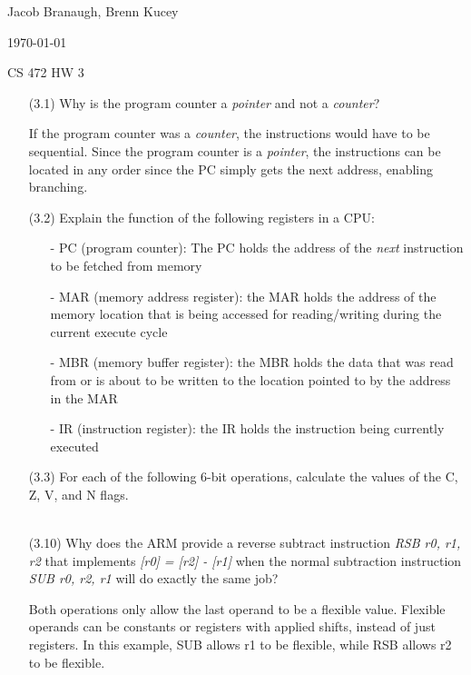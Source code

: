 \documentclass[letterpaper,10pt,titlepage]{article}
\def\name{Jacob Branaugh, Brenn Kucey}
\begin{document}
\hfill \name

\hfill \today

\hfill CS 472 HW 3

\begin{enumerate}
	\item[(3.1)] Why is the program counter a \textit{pointer} and not a
		\textit{counter}?
	\item[\textbullet] If the program counter was a \textit{counter}, the instructions
		would have to be sequential. Since the program counter is a
		\textit{pointer}, the instructions can be located in any order since the
		PC simply gets the next address, enabling branching.

	\item[(3.2)] Explain the function of the following registers in a CPU:
	\begin{enumerate}
		\item[-] PC (program counter): The PC holds the address of the
			\textit{next} instruction to be fetched from memory
		\item[-] MAR (memory address register): the MAR holds the address of the
			memory location that is being accessed for reading/writing during 
			the current execute cycle
		\item[-] MBR (memory buffer register): the MBR holds the data that was
			read from or is about to be written to the location pointed to by
			the address in the MAR
		\item[-] IR (instruction register): the IR holds the instruction being
			currently executed
	\end{enumerate}

	\item[(3.3)] For each of the following 6-bit operations, calculate the values of
		the C, Z, V, and N flags.
		\\
		\\

	\item[(3.10)] Why does the ARM provide a reverse subtract instruction \textit{RSB
		r0, r1, r2} that implements \textit{[r0] = [r2] - [r1]} when the normal
		subtraction instruction \textit{SUB  r0, r2, r1} will do exactly the same
		job?
	\item[\textbullet] Both operations only allow the last operand to be a flexible
		value. Flexible operands can be constants or registers with applied 
		shifts, instead of just registers. In this example, SUB allows r1 to be 
		flexible, while RSB allows r2 to be flexible. 


\end{enumerate}
\end{document}
